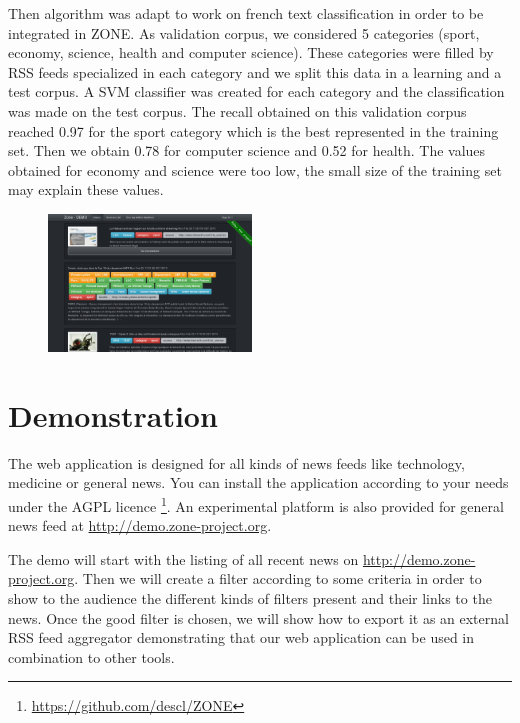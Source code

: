 \documentclass{llncs}
\begin{document}
Then algorithm was adapt to work on french text classification in order to be integrated in ZONE. As validation corpus, we considered 5 categories (sport, economy, science, health and computer science). These categories were filled by RSS feeds specialized in each category and we split this data in a learning and a test corpus. A SVM classifier was created for each category and the classification was made on the test corpus. The recall obtained on this validation corpus reached 0.97 for the sport category which is the best represented in the training set. Then we obtain 0.78 for computer science and 0.52 for health. The values obtained for economy and science were too low, the small size of the training set may explain these values.
\begin{figure}
  \vspace{15pt}
	\includegraphics[width=0.48\textwidth]{zone-screenshot.png}
	\label{fig:DEMO}
  \vspace{-60pt}
\end{figure}

\section{Demonstration}
%
The web application is designed for all kinds of news feeds like technology, medicine or general news. You can install the application according to your needs under the AGPL licence \footnote{\url{https://github.com/descl/ZONE}}. An experimental platform is also provided for general news feed at \url{http://demo.zone-project.org}.


The demo will start with the listing of all recent news on \url{http://demo.zone-project.org}. Then we will create a filter according to some criteria in order to show to the audience the different kinds of filters present and their links to the news. Once the good filter is chosen, we will show how to export it as an external RSS feed aggregator demonstrating that our web application can be used in combination to other tools.
\end{document}
